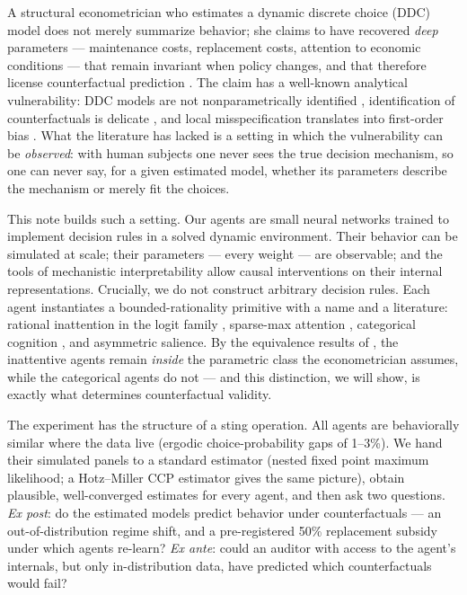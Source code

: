 \documentclass[11pt]{article}
\begin{document}
A structural econometrician who estimates a dynamic discrete choice (DDC)
model does not merely summarize behavior; she claims to have recovered
\emph{deep} parameters --- maintenance costs, replacement costs, attention to
economic conditions --- that remain invariant when policy changes, and that
therefore license counterfactual prediction \citep[in the sense
of][]{lucas1976, heckman2010}. The claim has a well-known analytical
vulnerability: DDC models are not nonparametrically identified
\citep{magnacthesmar2002}, identification of counterfactuals is delicate
\citep{kalouptsidi2021}, and local misspecification translates into
first-order bias \citep{bugniura2019}. What the literature has lacked is a
setting in which the vulnerability can be \emph{observed}: with human
subjects one never sees the true decision mechanism, so one can never say,
for a given estimated model, whether its parameters describe the mechanism
or merely fit the choices.

This note builds such a setting. Our agents are small neural networks
trained to implement decision rules in a solved dynamic environment. Their
behavior can be simulated at scale; their parameters --- every weight ---
are observable; and the tools of mechanistic interpretability
\citep{alainbengio2016, heimersheimnanda2024, elazar2021} allow causal
interventions on their internal representations. Crucially, we do not
construct arbitrary decision rules. Each agent instantiates a
bounded-rationality primitive with a name and a literature: rational
inattention in the logit family \citep{matejkamckay2015, steiner2017},
sparse-max attention \citep{gabaix2014}, categorical cognition
\citep{fryerjackson2008}, and asymmetric salience. By the equivalence
results of \citet{fosgerau2020}, the inattentive agents remain
\emph{inside} the parametric class the econometrician assumes, while the
categorical agents do not --- and this distinction, we will show, is exactly
what determines counterfactual validity.

The experiment has the structure of a sting operation. All agents are
behaviorally similar where the data live (ergodic choice-probability gaps of
1--3\%). We hand their simulated panels to a standard estimator (nested
fixed point maximum likelihood; a Hotz--Miller CCP estimator gives the same
picture), obtain plausible, well-converged estimates for every agent, and
then ask two questions. \emph{Ex post}: do the estimated models predict
behavior under counterfactuals --- an out-of-distribution regime shift, and
a pre-registered 50\% replacement subsidy under which agents re-learn?
\emph{Ex ante}: could an auditor with access to the agent's internals, but
only in-distribution data, have predicted which counterfactuals would fail?
\end{document}
